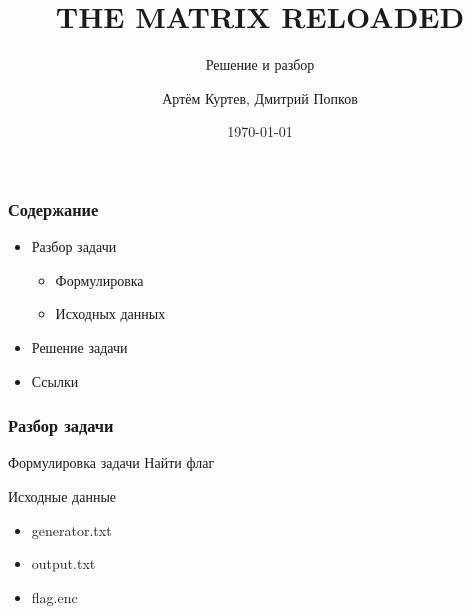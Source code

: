 \documentclass{beamer}
\title{THE MATRIX RELOADED}
\subtitle{Решение и разбор}
\author{Артём Куртев, Дмитрий Попков}
\institute{БФУ имени И.Канта}
\date{\today}
\begin{document}
	\begin{frame}
	\titlepage
	\end{frame}
	\begin{frame}
		\frametitle{Содержание}
		\begin{itemize}
			\item Разбор задачи
			\begin{itemize}
				\item Формулировка
				\item Исходных данных
			\end{itemize}
			\item Решение задачи
			\item Ссылки
		\end{itemize}
	\end{frame}
	
	\begin{frame}
		\frametitle{Разбор задачи}
		\begin{block}{Формулировка задачи}
			Найти флаг
		\end{block}
		\begin{block}{Исходные данные}
			\begin{itemize}
				\item generator.txt
				\item output.txt
                                \item flag.enc
				
			\end{itemize}
		\end{block}
	\end{frame}
\end{document}

